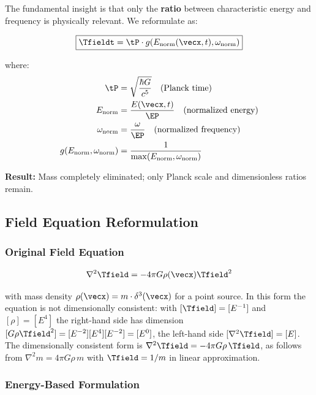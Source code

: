 	The fundamental insight is that only the \textbf{ratio} between characteristic energy and frequency is physically relevant. We reformulate as:
	
	\begin{equation}
		\boxed{\Tfieldt = \tP \cdot g(E_{\text{norm}}(\vecx,t), \omega_{\text{norm}})}
		\label{eq:time_field_mass_free}
	\end{equation}
	
	where:
	\begin{align}
		\tP &= \sqrt{\frac{\hbar G}{c^5}} \quad \text{(Planck time)} \\
		E_{\text{norm}} &= \frac{E(\vecx,t)}{\EP} \quad \text{(normalized energy)} \\
		\omega_{\text{norm}} &= \frac{\omega}{\EP} \quad \text{(normalized frequency)} \\
		g(E_{\text{norm}}, \omega_{\text{norm}}) &= \frac{1}{\max(E_{\text{norm}}, \omega_{\text{norm}})}
	\end{align}
	
	\textbf{Result:} Mass completely eliminated; only Planck scale and dimensionless ratios remain.
	
	\subsection{Field Equation Reformulation}
	\label{subsec:field_equation_elimination}
	
	\subsubsection{Original Field Equation}
	
	\begin{equation}
		\nabla^2 \Tfield = -4\pi G \rho(\vecx) \Tfield^2
		\label{eq:field_equation_original}
	\end{equation}
	
	with mass density $\rho(\vecx) = m \cdot \delta^3(\vecx)$ for a point source. In this form the equation is not dimensionally consistent: with $[\Tfield]=[E^{-1}]$ and $[\rho]=[E^4]$ the right-hand side has dimension $[G\rho\Tfield^2]=[E^{-2}][E^4][E^{-2}]=[E^0]$, the left-hand side $[\nabla^2\Tfield]=[E]$. The dimensionally consistent form is $\nabla^2\Tfield=-4\pi G\rho\,\Tfield$, as follows from $\nabla^2 m=4\pi G\rho\, m$ with $\Tfield=1/m$ in linear approximation.
	
	\subsubsection{Energy-Based Formulation}
	
